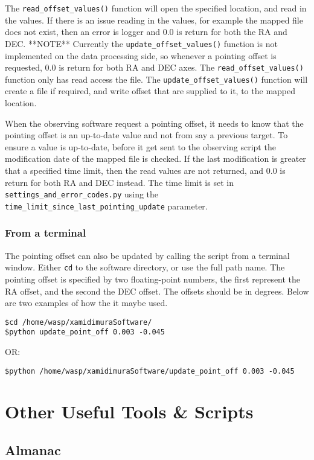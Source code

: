 \documentclass[a4paper,12pt]{article}
\begin{document}
The {\tt read\_offset\_values()} function will open the specified location, and read in the values. If there is an issue reading in the values, for example the mapped file does not exist, then an error is logger and 0.0 is return for both the RA and DEC. {\color{blue}**NOTE** Currently the {\tt update\_offset\_values()} function is not implemented on the data processing side, so whenever a pointing offset is requested, 0.0 is return for both RA and DEC axes.} The {\tt read\_offset\_values()} function only has read access the file. The {\tt update\_offset\_values()} function will create a file if required, and write offset that are supplied to it, to the mapped location.

When the observing software request a pointing offset, it needs to know that the pointing offset is an up-to-date value and not from say a previous target. To ensure a value is up-to-date, before it get sent to the observing script the modification date of the mapped file is checked. If the last modification is greater that a specified time limit, then the read values are not returned, and 0.0 is return for both RA and DEC instead. The time limit is set in {\tt settings\_and\_error\_codes.py} using the {\tt time\_limit\_since\_last\_pointing\_update} parameter.

\subsubsection{From a terminal}
The pointing offset can also be updated by calling the script from a terminal window. Either {\tt cd} to the software directory, or use the full path name. The pointing offset is specified by two floating-point numbers, the first represent the RA offset, and the second the DEC offset. The offsets should be in degrees. Below are two examples of how the it maybe used.
\begin{verbatim}
$cd /home/wasp/xamidimuraSoftware/
$python update_point_off 0.003 -0.045
\end{verbatim}
OR:
\begin{verbatim}
$python /home/wasp/xamidimuraSoftware/update_point_off 0.003 -0.045
\end{verbatim}




\section{Other Useful Tools \& Scripts} 


\subsection{Almanac}
\label{sec:almanac}
            
\end{document}

